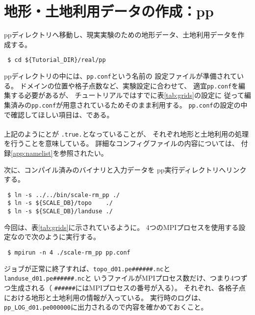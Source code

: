 \section{地形・土地利用データの作成：pp}
\label{sec:tutrial_real_pp}

ppディレクトリへ移動し、現実実験のための地形データ、土地利用データを作成する。
\begin{verbatim}
 $ cd ${Tutorial_DIR}/real/pp
\end{verbatim}
ppディレクトリの中には、\verb|pp.conf|という名前の
設定ファイルが準備されている。
ドメインの位置や格子点数など、実験設定に合わせて、
適宜\verb|pp.conf|を編集する必要があるが、
チュートリアルではすでに表\ref{tab:grids}の設定に
従って編集済みの\verb|pp.conf|が用意されているためそのまま利用する。
\verb|pp.conf|の設定の中で確認してほしい項目は、である。\\

\\

\noindent 上記のようにとが
\verb|.true.|となっていることが、
それぞれ地形と土地利用の処理を行うことを意味している。
詳細なコンフィグファイルの内容については、
付録\ref{app:namelist}を参照されたい。

次に、コンパイル済みのバイナリと入力データを
pp実行ディレクトリへリンクする。
\begin{verbatim}
 $ ln -s ../../bin/scale-rm_pp ./
 $ ln -s ${SCALE_DB}/topo    ./
 $ ln -s ${SCALE_DB}/landuse ./
\end{verbatim}
今回は、表\ref{tab:grids}に示されているように。
4つのMPIプロセスを使用する設定なので次のように実行する。
\begin{verbatim}
 $ mpirun -n 4 ./scale-rm_pp pp.conf
\end{verbatim}
ジョブが正常に終了すれば、\verb|topo_d01.pe######.nc|と\\
\verb|landuse_d01.pe######.nc|と
いうファイルがMPIプロセス数だけ、つまり4つずつ生成される（
\verb|######|にはMPIプロセスの番号が入る）。
それぞれ、各格子点における地形と土地利用の情報が入っている。
実行時のログは、\verb|pp_LOG_d01.pe000000|に出力されるので内容を確かめておくこと。


